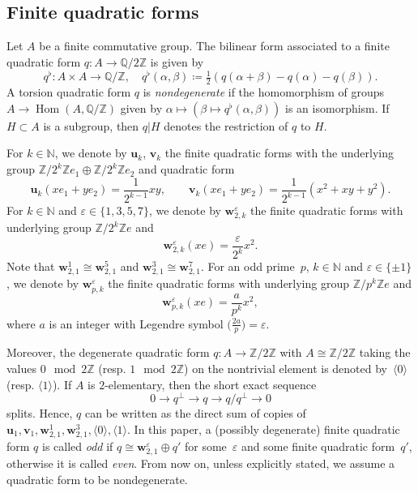 \documentclass[a4paper]{amsart}
\theoremstyle{definition}
\theoremstyle{plain}
\DeclareMathOperator{\Hom}{Hom}
\newcommand{\IQ}{\mathbb{Q}}
\newcommand{\IZ}{\mathbb{Z}}
\newcommand{\IN}{\mathbb{N}}
\newcommand{\bu}{\mathbf{u}}
\newcommand{\bv}{\mathbf{v}}
\newcommand{\bw}{\mathbf{w}}
\begin{document}
\subsection{Finite quadratic forms} \label{subsec:finite-quadratic-forms}
Let \(A\) be a finite commutative group. The bilinear form associated to a finite quadratic form \(q\colon A \rightarrow \IQ/2\IZ\) is given by
\[
q^\flat\colon A \times A \rightarrow \IQ/\IZ, \quad q^\flat(\alpha,\beta)\coloneqq \tfrac{1}{2} (q(\alpha+\beta)-q(\alpha)-q(\beta)).
\] 
A torsion quadratic form \(q\) is \emph{nondegenerate} if the homomorphism of groups \(A \rightarrow \Hom(A,\IQ/\IZ)\) given by \(\alpha \mapsto (\beta \mapsto q^\flat(\alpha, \beta))\) is an isomorphism.
If \(H \subset A\) is a subgroup, then \(q|H\) denotes the restriction of \(q\) to \(H\).

For \(k \in \IN\), we denote by \(\bu_k\), \(\bv_k\) the finite quadratic forms with the underlying group 
\(\IZ/2^k\IZ e_1 \oplus \IZ/2^k\IZ e_2\) and quadratic form 
\[
    \bu_k(x e_1 + y e_2) = \frac{1}{2^{k-1}} xy, \qquad \bv_k(x e_1 + y e_2) = \frac{1}{2^{k-1}} (x^2 + xy + y^2).
\]
For \(k \in \IN\) and \(\varepsilon \in \{1,3,5,7\}\), we denote by \(\bw^\varepsilon_{2,k}\) the finite quadratic forms with underlying group \(\IZ/2^k\IZ e\) and
\[
\bw^\varepsilon_{2,k}(xe) = \frac{\varepsilon}{2^{k}} x^2.
\]
Note that \(\bw^1_{2,1} \cong \bw^5_{2,1}\) and \(\bw^3_{2,1} \cong \bw^7_{2,1}\). For an odd prime~\(p\), \(k \in \IN\) 
and \(\varepsilon \in \{\pm 1\}\), we denote by \(\bw^\varepsilon_{p,k}\) the finite quadratic forms with underlying group \(\IZ/p^k\IZ e\) and 
\[
    \bw^\varepsilon_{p,k}(xe) = \frac{a}{p^{k}} x^2,
\] 
where \(a\) is an integer with Legendre symbol \(\Big(\displaystyle \frac{2a}{p}\Big) = \varepsilon\). 

Moreover, the degenerate quadratic form \(q\colon A \rightarrow \IZ/2\IZ\) with \(A \cong \IZ/2\IZ\) taking the values \(0 \mod 2 \IZ\) (resp. \(1 \mod 2\IZ\)) on the nontrivial element is denoted by~\(\langle 0 \rangle\) (resp. \(\langle 1 \rangle\)).
%
If \(A\) is \(2\)-elementary, then the short exact sequence 
\[
0 \rightarrow q^\perp \rightarrow q \rightarrow q/q^\perp \rightarrow 0
\]
splits.
Hence, \(q\) can be written as the direct sum of copies of \(\bu_1, \bv_1, \bw^1_{2,1}, \bw^3_{2,1}, \langle 0 \rangle, \langle 1 \rangle\).
%
In this paper, a (possibly degenerate) finite quadratic form \(q\) is called \emph{odd} if \(q \cong \bw^\varepsilon_{2,1} \oplus q'\) for some~\(\varepsilon\) and some finite quadratic form~\(q'\), otherwise it is called \emph{even}.
From now on, unless explicitly stated, we assume a quadratic form to be nondegenerate.
\end{document}
